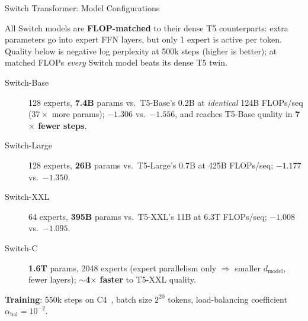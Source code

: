 \begin{frame}{Switch Transformer: Model Configurations}

  All Switch models are \textbf{FLOP-matched} to their dense T5 counterparts: extra parameters go into expert FFN layers, but only 1 expert is active per token. Quality below is negative log perplexity at 500k steps (higher is better); at matched FLOPs \emph{every} Switch model beats its dense T5 twin.

  \vspace{0.4em}
  \begin{description}
    \item[Switch-Base] 128 experts, \textbf{7.4B} params vs.\ T5-Base's 0.2B at \emph{identical} 124B FLOPs/seq ($37\times$ more params); $-1.306$ vs.\ $-1.556$, and reaches T5-Base quality in \textbf{7$\times$ fewer steps}.
    \item[Switch-Large] 128 experts, \textbf{26B} params vs.\ T5-Large's 0.7B at 425B FLOPs/seq; $-1.177$ vs.\ $-1.350$.
    \item[Switch-XXL] 64 experts, \textbf{395B} params vs.\ T5-XXL's 11B at 6.3T FLOPs/seq; $-1.008$ vs.\ $-1.095$.
    \item[Switch-C] \textbf{1.6T} params, 2048 experts (expert parallelism only $\Rightarrow$ smaller $d_{\text{model}}$, fewer layers); $\sim$\textbf{4$\times$ faster} to T5-XXL quality.
  \end{description}

  \vspace{0.3em}
  \textbf{Training}: 550k steps on C4~\cite{raffel2020t5}, batch size $2^{20}$ tokens, load-balancing coefficient $\alpha_{\text{bal}} = 10^{-2}$.
\end{frame}

